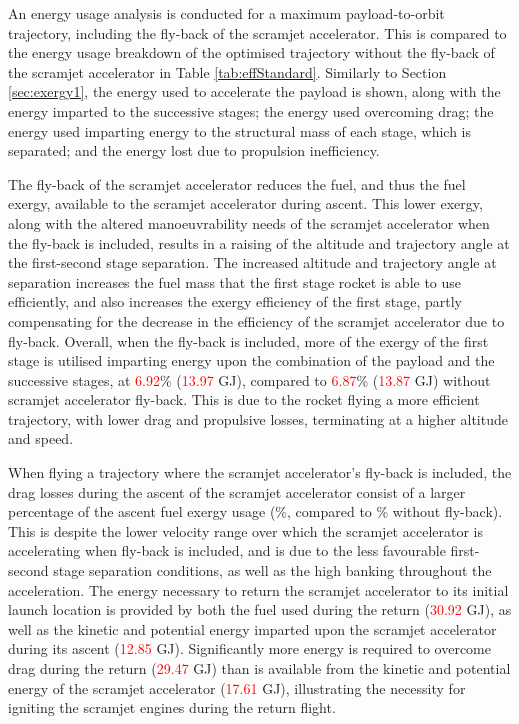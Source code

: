 An energy usage analysis is conducted for a maximum payload-to-orbit trajectory, including the fly-back of the scramjet accelerator. This is compared to the energy usage breakdown of the optimised trajectory without the fly-back of the scramjet accelerator in Table \ref{tab:effStandard}. Similarly to Section \ref{sec:exergy1}, the energy used to accelerate the payload is shown, along with the energy imparted to the successive stages; the energy used overcoming drag; the energy used imparting energy to the structural mass of each stage, which is separated; and the energy lost due to propulsion inefficiency. 



The fly-back of the scramjet accelerator reduces the fuel, and thus the fuel exergy, available to the scramjet accelerator during ascent.
This lower exergy, along with the altered manoeuvrability needs of the scramjet accelerator when the fly-back is included, results in a raising of the altitude and trajectory angle at the first-second stage separation. The increased altitude and trajectory angle at separation increases the fuel mass that the first stage rocket is able to use efficiently, and also increases the exergy efficiency of the first stage, partly compensating for the decrease in the efficiency of the scramjet accelerator due to fly-back. Overall, when the fly-back is included, more of the exergy of the first stage is utilised imparting energy upon the combination of the payload and the successive stages, at \textcolor{red}{6.92}\% (\textcolor{red}{13.97} GJ), compared to \textcolor{red}{6.87}\% (\textcolor{red}{13.87} GJ) without scramjet accelerator fly-back. This is due to the rocket flying a more efficient trajectory, with lower drag and propulsive losses, terminating at a higher altitude and speed.



When flying a trajectory where the scramjet accelerator's fly-back is included, the drag losses during the ascent of the scramjet accelerator consist of a larger percentage of the ascent fuel exergy usage  (\WDsecondStandard \%, compared to \WDsecondStandardNoReturn \% without fly-back). This is despite the lower velocity range over which the scramjet accelerator is accelerating when fly-back is included, and is due to the less favourable first-second stage separation conditions, as well as the high banking throughout the acceleration. 
The energy necessary to return the scramjet accelerator to its initial launch location is provided by both the fuel used during the return (\textcolor{red}{30.92} GJ), as well as the kinetic and potential energy imparted upon the scramjet accelerator during its ascent (\textcolor{red}{12.85} GJ). Significantly more energy is required to overcome drag during the return (\textcolor{red}{29.47} GJ) than is available from the kinetic and potential energy of the scramjet accelerator (\textcolor{red}{17.61} GJ), illustrating the necessity for igniting the scramjet engines during the return flight. 


